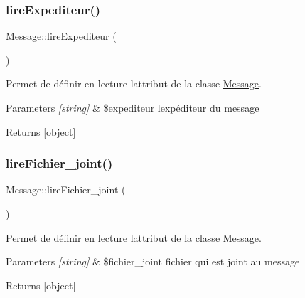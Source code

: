 \subsubsection{\texorpdfstring{lire\+Expediteur()}{lireExpediteur()}}
{\footnotesize\ttfamily Message\+::lire\+Expediteur (\begin{DoxyParamCaption}{ }\end{DoxyParamCaption})}



Permet de définir en lecture l\textquotesingle{}attribut de la classe \hyperlink{class_message}{Message}. 


\begin{DoxyParams}{Parameters}
{\em \mbox{[}string\mbox{]}} & \$expediteur l\textquotesingle{}expéditeur du message \\
\hline
\end{DoxyParams}
\begin{DoxyReturn}{Returns}
\mbox{[}object\mbox{]} 
\end{DoxyReturn}
\mbox{\label{class_message_a2f6feaebdadcde8720051b595a7d1cd2}} 
\subsubsection{\texorpdfstring{lire\+Fichier\+\_\+joint()}{lireFichier\_joint()}}
{\footnotesize\ttfamily Message\+::lire\+Fichier\+\_\+joint (\begin{DoxyParamCaption}{ }\end{DoxyParamCaption})}



Permet de définir en lecture l\textquotesingle{}attribut de la classe \hyperlink{class_message}{Message}. 


\begin{DoxyParams}{Parameters}
{\em \mbox{[}string\mbox{]}} & \$fichier\+\_\+joint fichier qui est joint au message \\
\hline
\end{DoxyParams}
\begin{DoxyReturn}{Returns}
\mbox{[}object\mbox{]} 
\end{DoxyReturn}
\mbox{\label{class_message_a3618c4428657046edb1e6634803ea4cd}} 
